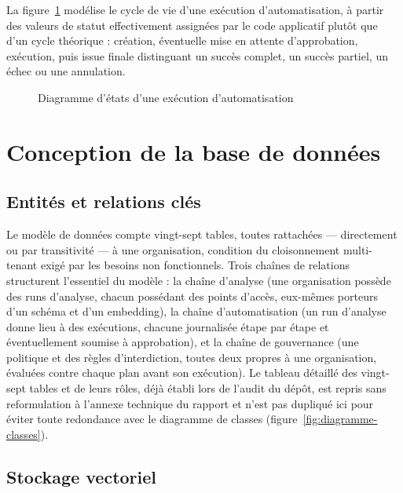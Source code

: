 La figure~\ref{fig:etats-plan} modélise le cycle de vie d'une exécution d'automatisation, à partir des valeurs de statut effectivement assignées par le code applicatif plutôt que d'un cycle théorique : création, éventuelle mise en attente d'approbation, exécution, puis issue finale distinguant un succès complet, un succès partiel, un échec ou une annulation.

\begin{figure}[H]
  \centering
  \caption{Diagramme d'états d'une exécution d'automatisation}
  \label{fig:etats-plan}
\end{figure}

\section{Conception de la base de données}
\label{sec:bdd}

\subsection{Entités et relations clés}

Le modèle de données compte vingt-sept tables, toutes rattachées — directement ou par transitivité — à une organisation, condition du cloisonnement multi-tenant exigé par les besoins non fonctionnels. Trois chaînes de relations structurent l'essentiel du modèle : la chaîne d'analyse (une organisation possède des runs d'analyse, chacun possédant des points d'accès, eux-mêmes porteurs d'un schéma et d'un embedding), la chaîne d'automatisation (un run d'analyse donne lieu à des exécutions, chacune journalisée étape par étape et éventuellement soumise à approbation), et la chaîne de gouvernance (une politique et des règles d'interdiction, toutes deux propres à une organisation, évaluées contre chaque plan avant son exécution). Le tableau détaillé des vingt-sept tables et de leurs rôles, déjà établi lors de l'audit du dépôt, est repris sans reformulation à l'annexe technique du rapport et n'est pas dupliqué ici pour éviter toute redondance avec le diagramme de classes (figure~\ref{fig:diagramme-classes}).

\subsection{Stockage vectoriel}

